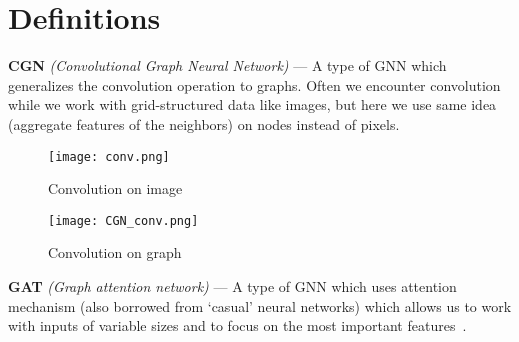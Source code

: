 \section{Definitions}

\textbf{CGN} \textit{(Convolutional Graph Neural Network)} --- A type of GNN which generalizes the convolution operation to graphs.
Often we encounter convolution while we work with grid-structured data like images, but here we use same idea (aggregate features of the neighbors) on nodes instead of pixels\cite{9046288}.

\begin{figure}[h]
    \begin{multicols}{2}
        \centering
        \texttt{[image: conv.png]}
        \caption{Convolution on image}
    
        \centering
        \texttt{[image: CGN\_conv.png]}
        \caption{Convolution on graph}
    \end{multicols}
\end{figure}

\textbf{GAT} \textit{(Graph attention network)} --- A type of GNN which uses attention mechanism (also borrowed from `casual' neural networks) which allows us to work with inputs of variable sizes and to focus on the most important features~\cite{velickovic2018graph}. 

